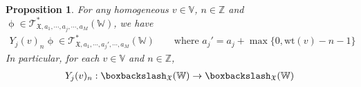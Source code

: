 \documentclass[11pt,b5paper,notitlepage]{article}
\theoremstyle{definition}
\theoremstyle{plain}
\newtheorem{pp}[df]{Proposition}
\newtheorem{lm}[df]{Lemma}
\newcommand{\Vbb}{\mathbb V}
\newcommand{\Wbb}{\mathbb W}
\newcommand{\Zbb}{\mathbb Z}
\newcommand{\wt}{\mathrm{wt}}
\newcommand{\<}{\left\langle}
\renewcommand{\>}{\right\rangle}
\newcommand{\fx}{\mathfrak{X}}
\newcommand{\ST}{\mathscr{T}}
\numberwithin{equation}{section}
\begin{document}
\begin{comment}
    \begin{lm}

    \end{lm}
    \begin{proof}
        By Thm. \ref{lb18}-(1), $\wr^2\upphi(u,v,w)$ is independent of the choice of $a_1,\cdots,a_M$ when $u$ is a section near $x_1,\cdots,x_N$. By Assumption \ref{ass1} and analytic continuation, $\wr^2\upphi(u,v,w)$ is independent of the choice of $a_1,\cdots,a_M$ for all $u$ and $v$.
    \end{proof}
\end{comment}


\begin{pp}\label{lb19}
For any homogeneous $v\in \Vbb$, $n\in \Zbb$ and $\upphi\in \ST_{\fx,a_1,\cdots,a_j,\cdots,a_M}^*(\Wbb)$, we have
\begin{align*}
Y_j(v)_n\upphi\in \ST_{\fx,a_1,\cdots,a_j',\cdots,a_M}^*(\Wbb)\qquad\text{where }a_j'=a_j+\max\{0,\wt(v)-n-1\}
\end{align*}
In particular, for each $v\in \Vbb$ and $n\in \Zbb$, 
\begin{gather*}
        Y_j(v)_n:\boxbackslash_\fx(\Wbb)\rightarrow \boxbackslash_\fx(\Wbb)
\end{gather*}
    \end{pp}
\end{document}
